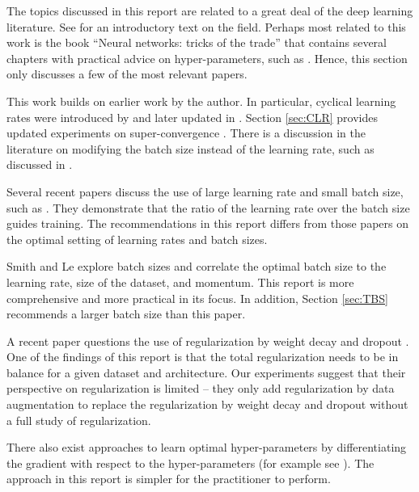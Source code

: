 \documentclass{article} %
\begin{document}
The topics discussed in this report are related to a great deal of the deep learning literature.  See \cite{goodfellow2016deep} for an introductory text on the field.  Perhaps most related to this work is the book ``Neural networks: tricks of the trade'' \citep{orr2003neural} that contains several chapters with practical advice on hyper-parameters, such as \cite{bengio2012practical}.  Hence, this section only discusses a few of the most relevant papers.

This work builds on earlier work by the author.  In particular, cyclical learning rates were introduced by \cite{smith2015no} and later updated in \cite{smith2017cyclical}.  Section \ref{sec:CLR} provides updated experiments on super-convergence \citep{smith2017super}.  There is a discussion in the literature on modifying  the batch size instead of the learning rate, such as discussed in \cite{smith2017don}.  


Several recent papers discuss the use of large learning rate and small batch size, such as \cite{jastrzebski2017residual,jastrzkebski2017three,xing2018walk}.  They demonstrate that the ratio of the learning rate over the batch size guides training.  The recommendations in this report differs from those papers on the optimal setting of learning rates and batch sizes.

Smith and Le \citep{smith2017understanding} explore batch sizes and correlate the optimal batch size to the learning rate, size of the dataset, and momentum.  This report is  more comprehensive and more practical in its focus.  In addition,  Section \ref{sec:TBS} recommends a larger batch size than this paper.  

A recent paper questions the use of regularization by weight decay and dropout \citep{hernandez2018deep}.  One of the findings of this report is that the total regularization needs to be in balance for a given dataset and architecture.  Our experiments suggest that their perspective on regularization is limited -- they only add regularization by data augmentation to replace the regularization by weight decay and dropout without a full study of regularization.

There also exist approaches to learn optimal hyper-parameters by differentiating the gradient with respect to the hyper-parameters (for example see \cite{lorraine2018stochastic}).  The approach in this report is simpler for the practitioner to perform.
\end{document}
